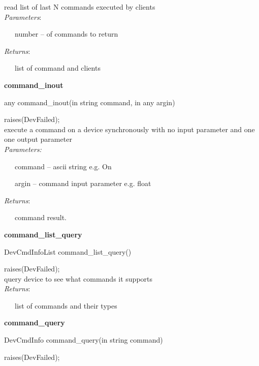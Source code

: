 read list of last N commands executed by clients\\


\emph{Parameters}:

~~~number -- of commands to return

\emph{Returns}:

~~~list of command and clients\\


\begin{flushleft}
\textbf{command\_inout}
\par\end{flushleft}

any command\_inout(in string command, in any argin)

raises(DevFailed);\\


execute a command on a device synchronously with no input parameter
and one one output parameter\\


\emph{Parameters:}

~~~command -- ascii string e.g. \textquotedbl{}On\textquotedbl{}

~~~argin -- command input parameter e.g. float

\emph{Returns}:

~~~command result.\\


\begin{flushleft}
\textbf{command\_list\_query}
\par\end{flushleft}

DevCmdInfoList command\_list\_query()

raises(DevFailed);\\


query device to see what commands it supports\\


\emph{Returns}:

~~~list of commands and their types\\


\begin{flushleft}
\textbf{command\_query}
\par\end{flushleft}

DevCmdInfo command\_query(in string command)

raises(DevFailed);\\


